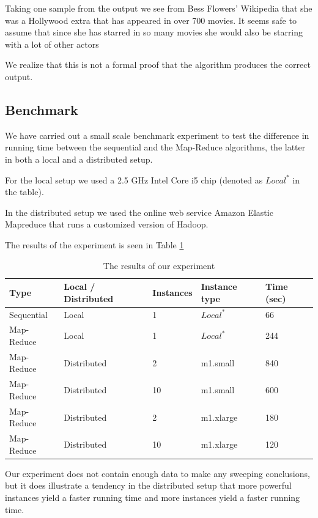 \documentclass[a4paper,11pt]{article}
\begin{document}
Taking one sample from the output we see from Bess Flowers' Wikipedia that she was a Hollywood extra that has appeared in over 700 movies. It seems safe to assume that since she has starred in so many movies she would also be starring with a lot of other actors

We realize that this is not a formal proof that the algorithm produces the correct output.

\subsection{Benchmark}
We have carried out a small scale benchmark experiment to test the difference in running time between the sequential and the Map-Reduce algorithms, the latter in both a local and a distributed setup. 

For the local setup we used a 2.5 GHz Intel Core i5 chip (denoted as $Local^*$ in the table). 

In the distributed setup we used the online web service Amazon Elastic Mapreduce that runs a customized version of Hadoop. 

The results of the experiment is seen in Table \ref{tab:benchmark}

\begin{table}[h!]

\begin{center}
    \begin{tabular}{|l|l|l|l|l|}
    \hline
    Type       & Local / Distributed & Instances & Instance type                     & Time (sec) \\ \hline
    Sequential & Local               & 1         & $Local^*$ & 66                 \\ \hline
    Map-Reduce & Local               & 1         & $Local^*$ & 244                 \\ \hline
    Map-Reduce & Distributed         & 2         & m1.small                          & 840                 \\ \hline
    Map-Reduce & Distributed         & 10        & m1.small                          & 600                 \\ \hline
    Map-Reduce & Distributed         & 2         & m1.xlarge                         & 180                 \\ \hline
    Map-Reduce & Distributed         & 10        & m1.xlarge                         & 120                 \\ \hline
    \end{tabular}
    \end{center}
    \caption{The results of our experiment}\label{tab:benchmark}
\end{table}
Our experiment does not contain enough data to make any sweeping conclusions, but it does illustrate a tendency in the distributed setup that more powerful instances yield a faster running time and more instances yield a faster running time. 
\end{document}
